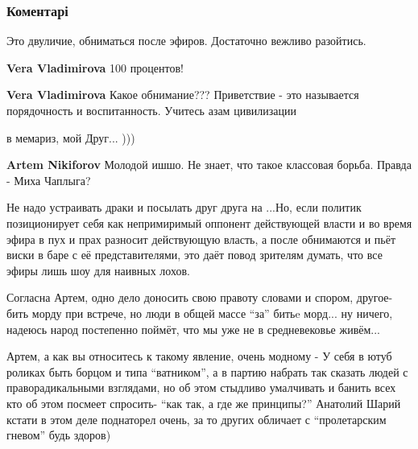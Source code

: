  
 
 
 
 
\subsubsection{Коментарі}
\label{sec:28_11_2021.fb.nikiforov_artem.1.my_ne_vragi.cmt}

\begin{itemize} %
Это двуличие, обниматься после эфиров. Достаточно вежливо разойтись.

\begin{itemize} %
\textbf{Vera Vladimirova} 100 процентов!

\textbf{Vera Vladimirova} Какое обнимание??? Приветствие - это называется порядочность и воспитанность. Учитесь азам цивилизации
\end{itemize} %


в мемариз, мой Друг... )))

\textbf{Artem Nikiforov} Молодой ишшо. Не знает, что такое классовая борьба. Правда - Миха Чаплыга?


Не надо устраивать драки и посылать друг друга на ...Но, если политик
позиционирует себя как непримиримый оппонент действующей власти и во время
эфира в пух и прах разносит действующую власть, а после обнимаются и пьёт виски
в баре с её представителями, это даёт повод зрителям думать, что все эфиры лишь
шоу для наивных лохов.



Согласна Артем, одно дело доносить свою правоту словами и спором, другое- бить
морду при встрече, но люди в общей массе \enquote{за} битьe морд... ну ничего, надеюсь
народ постепенно поймёт, что мы уже не в средневековье живём...


Артем, а как вы относитесь к такому явление, очень модному - У себя в ютуб
роликах быть борцом и типа \enquote{ватником}, а в партию набрать так сказать людей с
праворадикальными взглядами, но об этом стыдливо умалчивать и банить всех кто
об этом посмеет спросить- \enquote{как так, а где же принципы?} Анатолий Шарий кстати в
этом деле поднаторел очень, за то других обличает с \enquote{пролетарским гневом} будь
здоров)


\end{itemize}
